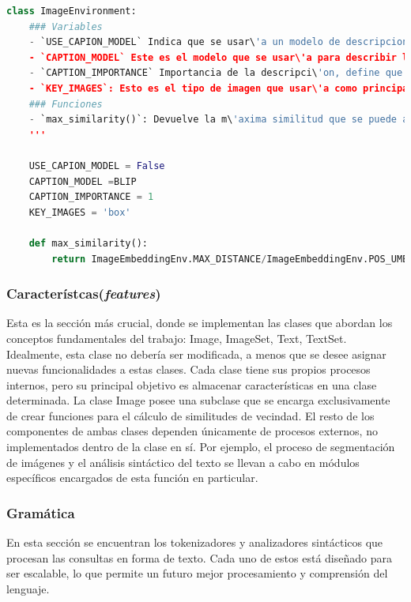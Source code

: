 \begin{lstlisting}[language=Python]
class ImageEnvironment:
    ### Variables 
    - `USE_CAPION_MODEL` Indica que se usar\'a un modelo de descripciones de im\'agenes
    - `CAPTION_MODEL` Este es el modelo que se usar\'a para describir la im\'agen
    - `CAPTION_IMPORTANCE` Importancia de la descripci\'on, define que tan importante ser la descripci\'on de una imagen para la similitud. Valor=1 indica que tiene igual importancia que la imagen.
    - `KEY_IMAGES`: Esto es el tipo de imagen que usar\'a como principal. (box or mask).
    ### Funciones
    - `max_similarity()`: Devuelve la m\'axima similitud que se puede alcanzar en la distancia entre dos im\'agenes. 
    '''

    USE_CAPION_MODEL = False
    CAPTION_MODEL =BLIP
    CAPTION_IMPORTANCE = 1
    KEY_IMAGES = 'box'

    def max_similarity():
        return ImageEmbeddingEnv.MAX_DISTANCE/ImageEmbeddingEnv.POS_UMBRAL

\end{lstlisting}

\subsubsection{Caracter\'istcas(\textit{features})}
Esta es la sección m\'as crucial, donde se implementan las clases que abordan los conceptos fundamentales del trabajo: Image, ImageSet, Text, TextSet. Idealmente, esta clase no debería ser modificada, a menos que se desee asignar nuevas funcionalidades a estas clases. Cada clase tiene sus propios procesos internos, pero su principal objetivo es almacenar características en una clase determinada. 
La clase Image posee una subclase que se encarga exclusivamente de crear funciones para el c\'alculo de similitudes de vecindad. El resto de los componentes de ambas clases dependen únicamente de procesos externos, no implementados dentro de la clase en sí. Por ejemplo, el proceso de segmentación de im\'agenes y el an\'alisis sint\'actico del texto se llevan a cabo en módulos específicos encargados de esta función en particular.

\subsubsection{Gram\'atica}
En esta sección se encuentran los tokenizadores y analizadores sint\'acticos que procesan las consultas en forma de texto. Cada uno de estos est\'a diseñado para ser escalable, lo que permite un futuro mejor procesamiento y comprensión del lenguaje.

